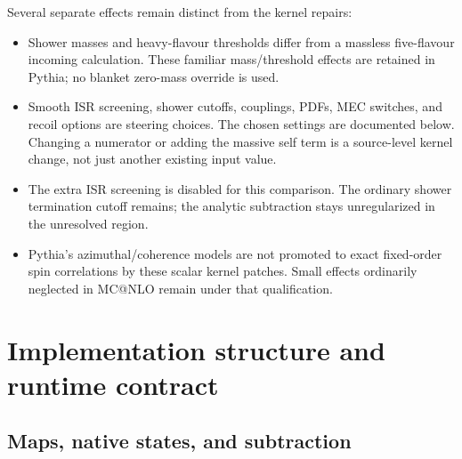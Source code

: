 \documentclass[11pt,a4paper]{article}
\begin{document}
Several separate effects remain distinct from the kernel repairs:
\begin{itemize}
\item Shower masses and heavy-flavour thresholds differ from a massless
five-flavour incoming calculation. These familiar mass/threshold effects
are retained in Pythia; no blanket zero-mass override is used.
\item Smooth ISR screening, shower cutoffs, couplings, PDFs, MEC switches,
and recoil options are steering choices. The chosen settings are documented
below. Changing a numerator or adding the massive self term is a source-level
kernel change, not just another existing input value.
\item The extra ISR screening is disabled for this comparison. The ordinary
shower termination cutoff remains; the analytic subtraction stays
unregularized in the unresolved region.
\item Pythia's azimuthal/coherence models are not promoted to exact
fixed-order spin correlations by these scalar kernel patches. Small effects
ordinarily neglected in MC@NLO remain under that qualification.
\end{itemize}

\section{Implementation structure and runtime contract}\label{sec:implementation}

\subsection{Maps, native states, and subtraction}
\end{document}
